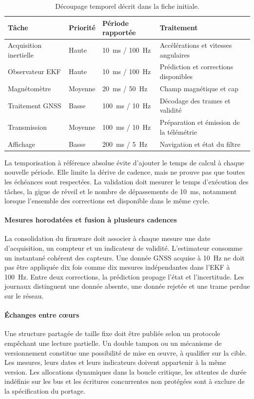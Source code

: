\documentclass[11pt,a4paper]{article}
\begin{document}
\begin{table}[!htbp]\centering\small
\begin{tabularx}{\linewidth}{|L{3.5cm}|L{2.0cm}|L{3.0cm}|Y|}\hline
{}\textbf{Tâche} & \textbf{Priorité} & \textbf{Période rapportée} & \textbf{Traitement}\\\hline
Acquisition inertielle & Haute & 10~ms / 100~Hz & Accélérations et vitesses angulaires\\\hline
Observateur EKF & Haute & 10~ms / 100~Hz & Prédiction et corrections disponibles\\\hline
Magnétomètre & Moyenne & 20~ms / 50~Hz & Champ magnétique et cap\\\hline
Traitement GNSS & Basse & 100~ms / 10~Hz & Décodage des trames et validité\\\hline
Transmission & Moyenne & 100~ms / 10~Hz & Préparation et émission de la télémétrie\\\hline
Affichage & Basse & 200~ms / 5~Hz & Navigation et état du filtre\\\hline
\end{tabularx}
\caption{Découpage temporel décrit dans la fiche initiale.}
\end{table}

La temporisation à référence absolue évite d'ajouter le temps de calcul à chaque nouvelle période. Elle limite la dérive de cadence, mais ne prouve pas que toutes les échéances sont respectées. La validation doit mesurer le temps d'exécution des tâches, la gigue de réveil et le nombre de dépassements de 10~ms, notamment lorsque l'ensemble des corrections est disponible dans le même cycle.

\paragraph{Mesures horodatées et fusion à plusieurs cadences}
La consolidation du firmware doit associer à chaque mesure une date d'acquisition, un compteur et un indicateur de validité. L'estimateur consomme un instantané cohérent des capteurs. Une donnée GNSS acquise à 10~Hz ne doit pas être appliquée dix fois comme dix mesures indépendantes dans l'EKF à 100~Hz. Entre deux corrections, la prédiction propage l'état et l'incertitude. Les journaux distinguent une donnée absente, une donnée rejetée et une trame perdue sur le réseau.

\paragraph{Échanges entre cœurs}
Une structure partagée de taille fixe doit être publiée selon un protocole empêchant une lecture partielle. Un double tampon ou un mécanisme de versionnement constitue une possibilité de mise en œuvre, à qualifier sur la cible. Les mesures, leurs dates et leurs indicateurs doivent appartenir à la même version. Les allocations dynamiques dans la boucle critique, les attentes de durée indéfinie sur les bus et les écritures concurrentes non protégées sont à exclure de la spécification du portage.
\FloatBarrier
\end{document}
